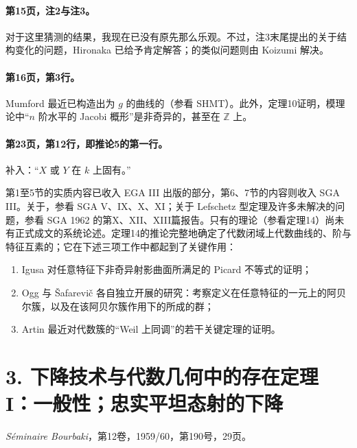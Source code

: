 \paragraph{第15页，注2与注3。}对于这里猜测的结果，我现在已没有原先那么乐观。不过，注3末尾提出的关于结构变化的问题，Hironaka 已给予肯定解答；的类似问题则由 Koizumi 解决。

\paragraph{第16页，第3行。}Mumford 最近已构造出为 $g$ 的曲线的（参看 SHMT）。此外，定理10证明，模理论中“$n$ 阶水平的 Jacobi 概形”是非奇异的，甚至在 $\mathbb Z$ 上。

\paragraph{第23页，第12行，即推论5的第一行。}补入：“$X$ 或 $Y$ 在 $k$ 上固有。”

第1至5节的实质内容已收入 EGA III 出版的部分，第6、7节的内容则收入 SGA III。关于，参看 SGA V、IX、X、XI；关于 Lefschetz 型定理及许多未解决的问题，参看 SGA 1962 的第X、XII、XIII篇报告。只有的理论（参看定理14）尚未有正式成文的系统论述。定理14的推论完整地确定了代数闭域上代数曲线的、阶与特征互素的；它在下述三项工作中都起到了关键作用：
\begin{enumerate}[label=\arabic*°]
\item Igusa 对任意特征下非奇异射影曲面所满足的 Picard 不等式的证明；
\item Ogg 与 Šafarevič 各自独立开展的研究：考察定义在任意特征的一元上的阿贝尔簇，以及在该阿贝尔簇作用下的所成的群；
\item Artin 最近对代数簇的“Weil 上同调”的若干关键定理的证明。
\end{enumerate}

\section*{3. 下降技术与代数几何中的存在定理 I：一般性；忠实平坦态射的下降}
\noindent\textit{Séminaire Bourbaki}，第12卷，1959/60，第190号，29页。

